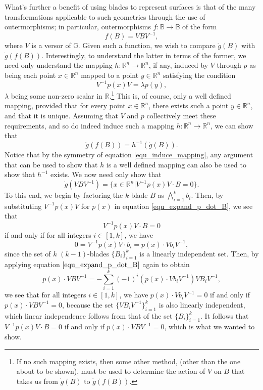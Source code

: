 \documentclass{birkjour}
\theoremstyle{definition}
\theoremstyle{remark}
\numberwithin{equation}{section}
\newcommand{\R}{\mathbb{R}}
\newcommand{\B}{\mathbb{B}}
\newcommand{\G}{\mathbb{G}}
\newcommand{\gd}{\dot{g}}
\begin{document}
What's further a benefit of using blades to represent surfaces is that of the many transformations
applicable to such geometries through the use of outermorphisms; in particular,
outermorphisms $f:\B\to\B$ of the form
\begin{equation*}
f(B) = VBV^{-1},
\end{equation*}
where $V$ is a versor of $\G$.  Given such a function, we wish to
compare $\gd(B)$ with $\gd(f(B))$.  Interestingly, to understand
the latter in terms of the former, we need only understand the mapping $h:\R^n\to\R^n$,
if any, induced by $V$ through $p$ as being each point $x\in\R^n$ mapped to a point
$y\in\R^n$ satisfying the condition
\begin{equation}\label{equ_induce_mapping}
V^{-1}p(x)V=\lambda p(y),
\end{equation}
$\lambda$ being some non-zero scalar in $\R$.\footnote{If no such mapping exists,
then some other method, (other than the one about to be shown), must be used to determine the action of $V$ on $B$ that
takes us from $\gd(B)$ to $\gd(f(B))$.}
This is, of course, only a well defined mapping, provided that for every point $x\in\R^n$, there exists
such a point $y\in\R^n$, and that it is unique.
Assuming that $V$ and $p$ collectively meet these requirements, and so do indeed induce
such a mapping $h:\R^n\to\R^n$, we can show that
\begin{equation*}
\gd(f(B)) = h^{-1}(\gd(B)).
\end{equation*}
Notice that by the symmetry
of equation \eqref{equ_induce_mapping}, any argument that can be
used to show that $h$ is a well defined
mapping can also be used to show that $h^{-1}$ exists.
We now need only show that
\begin{equation*}
\gd(VBV^{-1})=\{x\in\R^n|V^{-1}p(x)V\cdot B=0\}.
\end{equation*}
To this end, we begin by factoring the $k$-blade $B$ as $\bigwedge_{i=1}^k b_i$.
Then, by substituting $V^{-1}p(x)V$ for $p(x)$ in equation \eqref{equ_expand_p_dot_B},
we see that
\begin{equation*}
V^{-1}p(x)V\cdot B=0
\end{equation*}
if and only if for all integers $i\in[1,k]$, we have
\begin{equation*}
0=V^{-1}p(x)V\cdot b_i=p(x)\cdot Vb_iV^{-1},
\end{equation*}
since the set of $k$ $(k-1)$-blades $\{B_i\}_{i=1}^k$ is a linearly
independent set.  Then, by applying equation $\eqref{equ_expand_p_dot_B}$ again
to obtain
\begin{equation*}
p(x)\cdot VBV^{-1} = -\sum_{i=1}^k(-1)^i(p(x)\cdot Vb_iV^{-1})VB_iV^{-1},
\end{equation*}
we see that
for all integers $i\in[1,k]$, we have $p(x)\cdot Vb_iV^{-1}=0$
if and only if $p(x)\cdot VBV^{-1}=0$, because the set $\{VB_iV^{-1}\}_{i=1}^k$ is
also linearly independent, which linear independence follows from that of the
set $\{B_i\}_{i=1}^k$.
It follows that $V^{-1}p(x)V\cdot B=0$ if and only if $p(x)\cdot VBV^{-1}=0$,
which is what we wanted to show.
\end{document}
